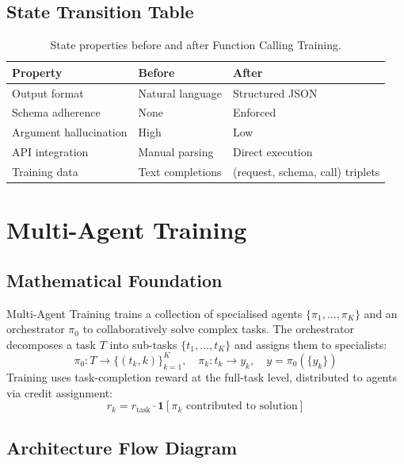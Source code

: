 \subsection{State Transition Table}
\begin{table}[h]\centering
\begin{tabular}{lll}\toprule
\textbf{Property} & \textbf{Before} & \textbf{After}\\\midrule
Output format & Natural language & Structured JSON\\
Schema adherence & None & Enforced\\
Argument hallucination & High & Low\\
API integration & Manual parsing & Direct execution\\
Training data & Text completions & (request, schema, call) triplets\\\bottomrule
\end{tabular}
\caption{State properties before and after Function Calling Training.}
\end{table}

\newpage
\section{Multi-Agent Training}

\subsection{Mathematical Foundation}
Multi-Agent Training trains a collection of specialised agents $\{\pi_1,\ldots,\pi_K\}$ and an orchestrator $\pi_0$ to collaboratively solve complex tasks. The orchestrator decomposes a task $T$ into sub-tasks $\{t_1,\ldots,t_K\}$ and assigns them to specialists:
\begin{equation}
  \pi_0: T \to \{(t_k, k)\}_{k=1}^K, \quad \pi_k: t_k \to y_k, \quad y = \pi_0(\{y_k\})
\end{equation}
Training uses task-completion reward at the full-task level, distributed to agents via credit assignment:
\begin{equation}
  r_k = r_{\text{task}} \cdot \mathbf{1}[\pi_k \text{ contributed to solution}]
\end{equation}

\subsection{Architecture Flow Diagram}

